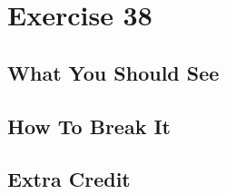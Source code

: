 \chapter{Exercise 38}


\section{What You Should See}


\section{How To Break It}


\section{Extra Credit}



